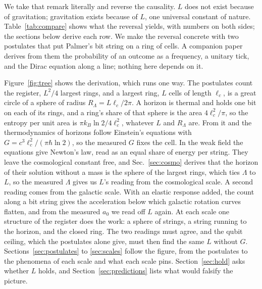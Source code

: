 \documentclass[aps,prd,twocolumn,superscriptaddress,nofootinbib,showkeys]{revtex4-2}
\newcommand{\lc}{\ell_c}
\newcommand{\RL}{R_\Lambda}
\begin{document}
We take that remark literally and reverse the causality. $L$ does not exist because of gravitation; gravitation exists because of $L$, one universal constant of nature. Table~\ref{tab:compare} shows what the reversal yields, with numbers on both sides; the sections below derive each row. We make the reversal concrete with two postulates that put Palmer's bit string on a ring of cells. A companion paper~\cite{korytko2026c} derives from them the probability of an outcome as a frequency, a unitary tick, and the Dirac equation along a line; nothing here depends on it.

Figure~\ref{fig:tree} shows the derivation, which runs one way. The postulates count the register, $L^2/4$ largest rings, and a largest ring, $L$ cells of length $\lc$, is a great circle of a sphere of radius $\RL = L\lc/2\pi$. A horizon is thermal and holds one bit on each of its rings, and a ring's share of that sphere is the area $4\lc^2/\pi$, so the entropy per unit area is $\pi k_B\ln2/4\lc^2$, whatever $L$ and $\RL$ are. From it and the thermodynamics of horizons follow Einstein's equations with $G = c^3\lc^2/(\pi\hbar\ln2)$, so the measured $G$ fixes the cell. In the weak field the equations give Newton's law, read as an equal share of energy per string. They leave the cosmological constant free, and Sec.~\ref{sec:cosmo} derives that the horizon of their solution without a mass is the sphere of the largest rings, which ties $\Lambda$ to $L$, so the measured $\Lambda$ gives us $L$'s reading from the cosmological scale. A second reading comes from the galactic scale. With an elastic response added, the count along a bit string gives the acceleration below which galactic rotation curves flatten, and from the measured $a_0$ we read off $L$ again. At each scale one structure of the register does the work: a sphere of strings, a string running to the horizon, and the closed ring. The two readings must agree, and the qubit ceiling, which the postulates alone give, must then find the same $L$ without $G$. Sections~\ref{sec:postulates} to \ref{sec:scales} follow the figure, from the postulates to the phenomena of each scale and what each scale pins. Section~\ref{sec:hold} asks whether $L$ holds, and Section~\ref{sec:predictions} lists what would falsify the picture.
\end{document}
